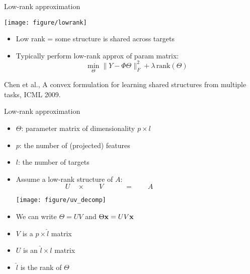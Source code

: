 \documentclass[11pt,compress,t,notes=noshow, xcolor=table]{beamer}
\begin{document}
\begin{frame}{Low-rank approximation}
	
	\begin{center}
		\texttt{[image: figure/lowrank]}
	\end{center}

	\begin{itemize}
		\item Low rank = some structure is shared across targets
		\item Typically perform low-rank approx of param matrix:
		$$\min_\Theta \|Y - \Phi \Theta \|^2_F + \lambda \, \mathrm{rank}(\Theta)$$
	\end{itemize}
	{\tiny Chen et al., A convex formulation for learning shared structures from
	multiple tasks, ICML 2009.}
\end{frame}

\begin{frame}{Low-rank approximation}
	
	
	\begin{itemize}
		\item $\Theta$: parameter matrix of dimensionality $p \times l$ 
		\item $p$: the number of (projected) features
		\item $l$: the number of targets
		\item Assume a low-rank structure of $A$:\\
		$ \qquad  \qquad\qquad \quad  U  \quad \times \qquad  V \qquad \quad  =  \qquad  A$
		\begin{center}		
			\texttt{[image: figure/uv\_decomp]}
		\end{center}
		
		\item We can write $\Theta=UV$ and $\Theta \mathbf{x} = UV \mathbf{x}$
		\item $V$ is a $p \times \hat{l}$ matrix
		\item  $U$ is an $\hat{l} \times l$ matrix	
		\item $\hat{l}$ is the rank of $\Theta$
	\end{itemize}
	
\end{frame}

	
\end{document}
